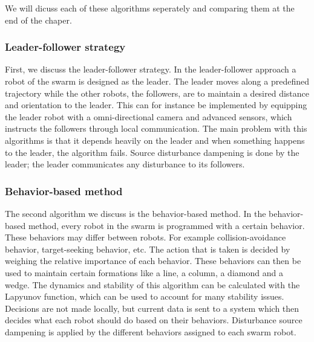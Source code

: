 We will dicuss each of these algorithms seperately and comparing them at the end of the chaper.

\subsubsection{Leader-follower strategy}
First, we discuss the leader-follower strategy. 
In the leader-follower approach a robot of the swarm is designed as the leader.
The leader moves along a predefined trajectory while the other robots, the followers, are to maintain a desired distance and orientation to the leader. \cite{consolini2008leader}
This can for instance be implemented by equipping the leader robot with a omni-directional camera and advanced sensors, which instructs the followers through local communication. \cite{das2002vision}
The main problem with this algorithms is that it depends heavily on the leader and when something happens to the leader, the algorithm fails. 
Source disturbance dampening is done by the leader; the leader communicates any disturbance to its followers.

\subsubsection{Behavior-based method}
The second algorithm we discuss is the behavior-based method. 
In the behavior-based method, every robot in the swarm is programmed with a certain behavior. 
These behaviors may differ between robots.
For example collision-avoidance behavior, target-seeking behavior, etc. 
The action that is taken is decided by weighing the relative importance of each behavior. \cite{consolini2008leader}
These behaviors can then be used to maintain certain formations like a line, a column, a diamond and a wedge. \cite{balch1998behavior}
The dynamics and stability of this algorithm can be calculated with the Lapyunov function, which can be used to account for many stability issues. \cite{lawton2003decentralized}
Decisions are not made locally, but current data is sent to a system which then decides what each robot should do based on their behaviors.
Disturbance source dampening is applied by the different behaviors assigned to each swarm robot.


